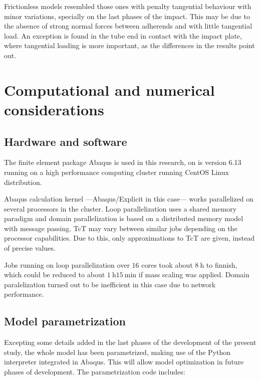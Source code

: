 \documentclass[cmfonts]{witpress}
\begin{document}
Frictionless models resembled those ones with penalty tangential behaviour with minor variations, specially on the last phases of the impact. This may be due to the absence of strong normal forces between adherends and with little tangential load. An exception is found in the tube end in contact with the impact plate, where tangential loading is more important, as the differences in the results point out.

\section{Computational and numerical considerations}

\subsection{Hardware and software}

The finite element package Abaqus is used in this research, on is version 6.13 \cite{Abaqus613Manual} running on a high performance computing cluster running CentOS Linux distribution.

Abaqus calculation kernel ---Abaqus/Explicit in this case--- works parallelized on several processors in the cluster. Loop parallelization uses a shared memory paradigm and domain parallelization is based on a distributed memory model with message passing. TcT may vary between similar jobs depending on the processor capabilities. Due to this, only approximations to TcT are given, instead of precise values.

Jobs running on loop parallelization over $16$ cores took about $\SI{8}{\hour}$ to finnish, which could be reduced to about $\SI{1}{\hour}$$\SI{15}{\minute}$ if mass scaling was applied. Domain paralelization turned out to be inefficient in this case due to network performance.


\subsection{Model parametrization}
\label{sec:script}

Excepting some details added in the last phases of the development of the present study, the whole model has been parametrized, making use of the Python interpreter integrated in Abaqus. This will allow model optimization in future phases of development. The parametrization code includes:
\end{document}
